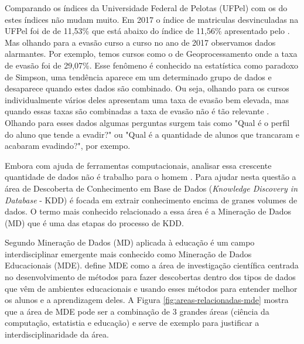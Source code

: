 \documentclass[diss,capa]{texufpel}
\begin{document}
Comparando os índices da Universidade Federal de Pelotas (UFPel) com os do \citet{inep:2018} estes índices não mudam muito. Em 2017 o índice de matriculas desvinculadas na UFPel foi de de 11,53\% que está abaixo do índice de 11,56\% apresentado pelo \citet{inep:2018}. Mas olhando para a evasão curso a curso no ano de 2017 observamos dados alarmantes. Por exemplo, temos cursos como o de Geoprocessamento onde a taxa de evasão foi de 29,07\%.  Esse fenômeno é conhecido na estatística como paradoxo de Simpson, uma tendência aparece em um determinado grupo de dados e desaparece quando estes dados são combinado. Ou seja, olhando para os cursos individualmente vários deles apresentam uma taxa de evasão bem elevada, mas quando essas taxas são combinadas a taxa de evasão não é tão relevante \cite{wagner1982simpson}. Olhando para esses dados algumas perguntas surgem tais como "Qual é o perfil do aluno que tende a evadir?" ou "Qual é a quantidade de alunos que trancaram e acabaram evadindo?", por exempo.

Embora com ajuda de ferramentas computacionais, analisar essa crescente quantidade de dados não é trabalho para o homem \cite{goldschmidt2015data}. Para ajudar nesta questão a área de Descoberta de Conhecimento em Base de Dados (\textit{Knowledge Discovery in Database} - KDD) é focada em extrair conhecimento encima de granes volumes de dados. O termo mais conhecido relacionado a essa área é a Mineração de Dados (MD) que é uma das etapas do processo de KDD.

Segundo \citet{Koedinger2008} Mineração de Dados (MD) aplicada à educação é um campo interdisciplinar emergente mais conhecido como Mineração de Dados Educacionais (MDE).
\citet{baker2010data} define MDE como a área de investigação científica centrada no desenvolvimento de métodos para fazer descobertas dentro dos tipos de dados que vêm de ambientes educacionais e usando esses métodos para entender melhor os alunos e a aprendizagem deles. A Figura \ref{fig:areas-relacionadas-mde} mostra que a área de MDE pode ser a combinação de 3 grandes áreas (ciência da computação, estatistia e educação) e serve de exemplo para justificar a interdisciplinaridade da área.
\end{document}
